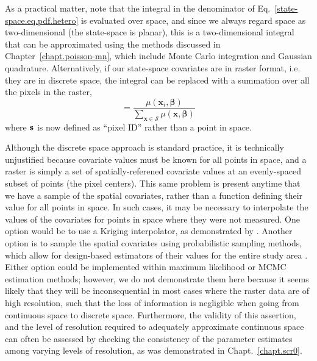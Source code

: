 As a practical matter, note that the integral in the
denominator of Eq.~\ref{state-space.eq.pdf.hetero} is evaluated over
space, and since we always regard space as two-dimensional (the
state-space is planar), this is a two-dimensional integral that can
be approximated using the methods discussed in
Chapter~\ref{chapt.poisson-mn}, which include
Monte Carlo integration and Gaussian quadrature. Alternatively, if
our state-space covariates are in raster format, i.e. they are
in discrete space, the integral can be replaced with a summation over
all the pixels in the raster,
\begin{equation}
[\mathbf{s}_i | \bm{\beta}] = \frac{\mu(\mathbf{x}_i, \bm{\beta})}{\sum_{\mathbf{x} \in \mathcal{S}} \mu(\mathbf{x}, \bm{\beta})}
\label{state-space.eq.pdf.hetero.d}
\end{equation}
where $\bf s$ is now defined as ``pixel ID'' rather than a point in space.

Although the discrete space approach is standard practice, it is
technically unjustified because covariate values must be known for all
points in space, and a raster is simply a set of spatially-referened
covariate values at an evenly-spaced subset of points (the pixel
centers). This same problem is present anytime that we have a
sample of the spatial covariates, rather than a function defining
their value for all points in space. In such cases, it may be necessary to
interpolate the values of the covariates for points in space where
they were not measured. One option would be to use a Kriging
interpolator, as demonstrated by \citet{rathbun:1996}. Another option
is to sample the spatial covariates using probabilistic sampling
methods, which allow for design-based estimators of their values for
the entire study area \citep{rathbun_etal:2007}. Either option could
be implemented within maximum likelihood or MCMC estimation methods;
however,
we do not demonstrate them here
because it seems likely that they will be inconsequential in most
cases where the raster data are of high resolution, such that the loss
of information is negligible when going from continuous space to
discrete space. Furthermore, the validity of this assertion, and the
level of resolution required to adequately approximate continuous
space can often be assessed by checking the consistency of the
parameter estimates among varying levels of resolution, as was
demonstrated in Chapt.~\ref{chapt.scr0}.

